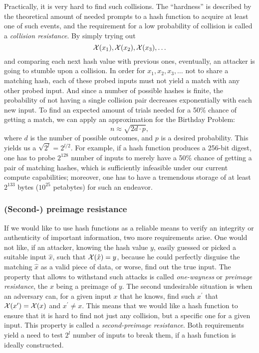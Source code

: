 Practically, it is very hard to find such collisions. The ``hardness'' is described by the theoretical amount of needed prompts to a hash function to acquire at least one of such events, and the requirement for a low probability of collision is called a \textit{collision resistance}. By simply trying out 
\[
\mathcal{X}(x_1), \mathcal{X}(x_2), \mathcal{X}(x_3), \ldots
\]
and comparing each next hash value with previous ones, eventually, an attacker is going to stumble upon a collision. In order for $x_1, x_2, x_3, \ldots$ not to share a matching hash, each of these probed inputs must not yield a match with any other probed input. And since a number of possible hashes is finite, the probability of not having a single collision pair decreases exponentially with each new input. To find an expected amount of trials needed for a 50\% chance of getting a match, we can apply an approximation for the Birthday Problem: 
\[n\approx \sqrt{2d\cdot p}, \]
where $d$ is the number of possible outcomes, and $p$ is a desired probability. This yields us a $\sqrt{2^l} = 2^{l/2}$. For example, if a hash function produces a 256-bit digest, one has to probe $2^{128}$ number of inputs to merely have a 50\% chance of getting a pair of matching hashes, which is sufficiently infeasible under our current compute capabilities; moreover, one has to have a tremendous storage of at least $2^{133}$ bytes ($10^{25}$ petabytes) for such an endeavor.

\subsubsection{(Second-) preimage resistance}
If we would like to use hash functions as a reliable means to verify an integrity or authenticity of important information, two more requirements arise. One would not like, if an attacker, knowing the hash value $y$, easily guessed or picked a suitable input $\hat{x}$, such that $\mathcal{X}(\hat{x}) = y$, because he could perfectly disguise the matching $\hat{x}$ as a valid piece of data, or worse, find out the true input. The property that allows to withstand such attacks is called \textit{one-wayness} or \textit{preimage resistance}, the $x$ being a preimage of $y$. The second undesirable situation is when an adversary can, for a given input $x$ that he knows, find such $x^\prime$ that $\mathcal{X}(x^\prime) = \mathcal{X}(x)$ and $x^\prime \neq x$. This means that we would like a hash function to ensure that it is hard to find not just any collision, but a specific one for a given input. This property is called a \textit{second-preimage resistance}. Both requirements yield a need to test $2^{l}$ number of inputs to break them, if a hash function is ideally constructed.

